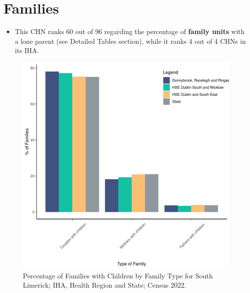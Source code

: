 \documentclass{article}
\begin{document}
\section{Families}\label{sect:Fam}
\begin{itemize}
\item This CHN ranks  60 out of 96 regarding the percentage of \textbf{family units} with a lone parent (see Detailed Tables section), while it ranks   4 out of 4 CHNs in its IHA.
\end{itemize}
\begin{figure}[H]
	\centering
	\includegraphics[width = 150mm]{../figures/FamED.pdf}
	\caption{Percentage of Families with Children by Family Type for South Limerick; IHA, Health Region and State; Census 2022.}
	\label{fig:vbnv}
	\end{figure}
	
\end{document}
